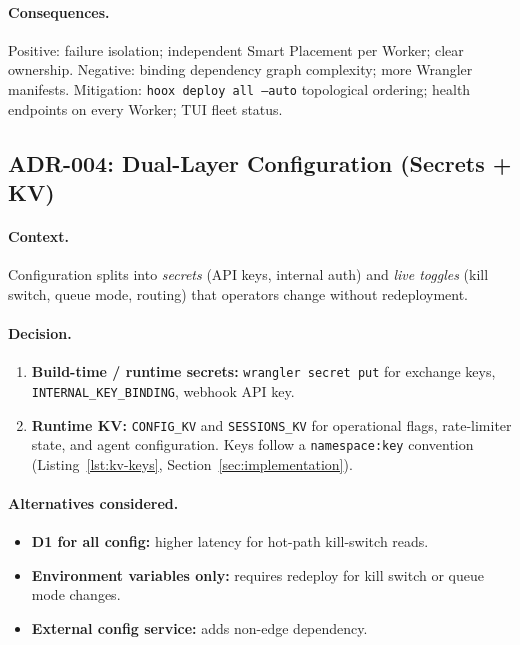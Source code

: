 \paragraph{Consequences.} Positive: failure isolation; independent Smart Placement per Worker; clear ownership. Negative: binding dependency graph complexity; more Wrangler manifests. Mitigation: \texttt{hoox deploy all --auto} topological ordering; health endpoints on every Worker; TUI fleet status.


\subsection{ADR-004: Dual-Layer Configuration (Secrets + KV)}

\paragraph{Context.} Configuration splits into \emph{secrets} (API keys, internal auth) and \emph{live toggles} (kill switch, queue mode, routing) that operators change without redeployment.

\paragraph{Decision.}
\begin{enumerate}
  \item \textbf{Build-time / runtime secrets:} \texttt{wrangler secret put} for exchange keys, \texttt{INTERNAL\_KEY\_BINDING}, webhook API key.
  \item \textbf{Runtime KV:} \texttt{CONFIG\_KV} and \texttt{SESSIONS\_KV} for operational flags, rate-limiter state, and agent configuration. Keys follow a \texttt{namespace:key} convention (Listing~\ref{lst:kv-keys}, Section~\ref{sec:implementation}).
\end{enumerate}

\paragraph{Alternatives considered.}
\begin{itemize}
  \item \textbf{D1 for all config:} higher latency for hot-path kill-switch reads.
  \item \textbf{Environment variables only:} requires redeploy for kill switch or queue mode changes.
  \item \textbf{External config service:} adds non-edge dependency.
\end{itemize}

